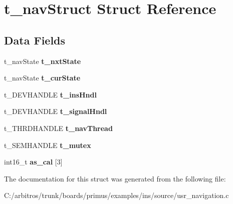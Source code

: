 \hypertarget{structt__nav_struct}{\section{t\-\_\-nav\-Struct Struct Reference}
\label{structt__nav_struct}
}
\subsection*{Data Fields}
\begin{DoxyCompactItemize}
\item 
\hypertarget{structt__nav_struct_a435f41a4ad07a241bdd14edca3b5935a}{t\-\_\-nav\-State {\bfseries t\-\_\-nxt\-State}}\label{structt__nav_struct_a435f41a4ad07a241bdd14edca3b5935a}

\item 
\hypertarget{structt__nav_struct_afe05b3734a86a599b2e83a7e16191b06}{t\-\_\-nav\-State {\bfseries t\-\_\-cur\-State}}\label{structt__nav_struct_afe05b3734a86a599b2e83a7e16191b06}

\item 
\hypertarget{structt__nav_struct_a7cfc76d8c03f3a0cbe991f2e472cc45b}{t\-\_\-\-D\-E\-V\-H\-A\-N\-D\-L\-E {\bfseries t\-\_\-ins\-Hndl}}\label{structt__nav_struct_a7cfc76d8c03f3a0cbe991f2e472cc45b}

\item 
\hypertarget{structt__nav_struct_ab14ef713ed09485609e3ddc0a485824b}{t\-\_\-\-D\-E\-V\-H\-A\-N\-D\-L\-E {\bfseries t\-\_\-signal\-Hndl}}\label{structt__nav_struct_ab14ef713ed09485609e3ddc0a485824b}

\item 
\hypertarget{structt__nav_struct_a5fa1a8a57bb2f2594f267599aef9a453}{t\-\_\-\-T\-H\-R\-D\-H\-A\-N\-D\-L\-E {\bfseries t\-\_\-nav\-Thread}}\label{structt__nav_struct_a5fa1a8a57bb2f2594f267599aef9a453}

\item 
\hypertarget{structt__nav_struct_ab0543e5662ae0b4ef5014d2c76ab248d}{t\-\_\-\-S\-E\-M\-H\-A\-N\-D\-L\-E {\bfseries t\-\_\-mutex}}\label{structt__nav_struct_ab0543e5662ae0b4ef5014d2c76ab248d}

\item 
\hypertarget{structt__nav_struct_a629aae3d4a8a6e3fd3e70984692aa19c}{int16\-\_\-t {\bfseries as\-\_\-cal} \mbox{[}3\mbox{]}}\label{structt__nav_struct_a629aae3d4a8a6e3fd3e70984692aa19c}

\end{DoxyCompactItemize}


The documentation for this struct was generated from the following file\-:\begin{DoxyCompactItemize}
\item 
C\-:/arbitros/trunk/boards/primus/examples/ins/source/usr\-\_\-navigation.\-c\end{DoxyCompactItemize}
